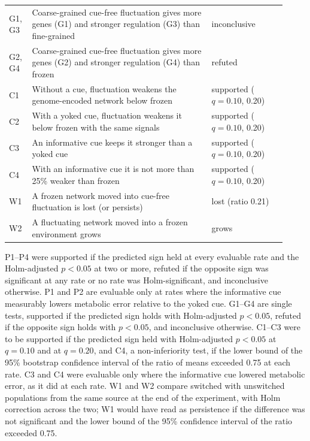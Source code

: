 \documentclass[10pt,letterpaper]{article}
\begin{document}
\begin{table}[!ht]
\begin{tabular}{@{}p{0.07\linewidth}p{0.6\linewidth}p{0.25\linewidth}@{}}
G1, G3 & Coarse-grained cue-free fluctuation gives more genes (G1) and stronger regulation (G3) than fine-grained & inconclusive \\
G2, G4 & Coarse-grained cue-free fluctuation gives more genes (G2) and stronger regulation (G4) than frozen & refuted \\
C1 & Without a cue, fluctuation weakens the genome-encoded network below frozen & supported ($q=0.10$, 0.20) \\
C2 & With a yoked cue, fluctuation weakens it below frozen with the same signals & supported ($q=0.10$, 0.20) \\
C3 & An informative cue keeps it stronger than a yoked cue & supported ($q=0.10$, 0.20) \\
C4 & With an informative cue it is not more than 25\% weaker than frozen & supported ($q=0.10$, 0.20) \\
W1 & A frozen network moved into cue-free fluctuation is lost (or persists) & lost (ratio 0.21) \\
W2 & A fluctuating network moved into a frozen environment grows & grows \\
\bottomrule
\end{tabular}
\begin{flushleft}\footnotesize
P1--P4 were supported if the predicted sign held at every evaluable rate and the Holm-adjusted $p<0.05$ at two or more, refuted if the opposite sign was significant at any rate or no rate was Holm-significant, and inconclusive otherwise. P1 and P2 are evaluable only at rates
where the informative cue measurably lowers metabolic error relative to the yoked
cue. G1--G4 are single tests, supported if the predicted sign holds with Holm-adjusted $p<0.05$, refuted if the opposite sign holds with $p<0.05$, and inconclusive otherwise.
C1--C3 were to be supported if the predicted sign held with Holm-adjusted
$p<0.05$ at $q=0.10$ and at $q=0.20$, and C4, a non-inferiority test, if the lower
bound of the 95\% bootstrap confidence interval of the ratio of means exceeded
0.75 at each rate. C3 and C4 were evaluable only where the informative cue
lowered metabolic error, as it did at each rate. W1 and W2 compare switched with
unswitched populations from the same source at the end of the experiment, with
Holm correction across the two; W1 would have read as persistence if the
difference was not significant and the lower bound of the 95\% confidence
interval of the ratio exceeded 0.75.
\end{flushleft}
\label{tab_predictions}
\end{table}
\end{document}
